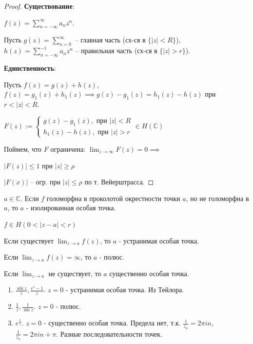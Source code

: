 \begin{proof}
    \textbf{Существование}:

    $f(z) = \sum_{n=-\infty}^{\infty} a_n z^n$.

    Пусть $g(z) = \sum_{n = 0}^{\infty}$ -- главная часть (сх-ся в $\{ |z| < R \}$), $h(z) = \sum_{n = -\infty}^{-1} a_n z^n$ -- правильная часть (сх-ся в $\{ |z| > r \}$).

    \textbf{Единственность}:

    Пусть $f(z) = g(z) + h(z)$, $f(z) = g_1(z) + h_1(z) \implies g(z) - g_1(z) = h_1(z) - h(z)$ при $r < |z| < R$.

    $F(z) := \begin{cases}
        g(z) - g_1(z), \text{ при } |z| < R \\
        h_1(z) - h(z), \text{ при } |z| > r
    \end{cases} \in H(\mathbb{C})$

    Поймем, что $F$ ограничена: $\lim_{z\rightarrow \infty} {F(z)} = 0 \implies$

    $|F(z)| \leq 1$ при $|z| \geq \rho$

    $|F(x)|$ -- огр. при $|z| \leq \rho$ по т. Вейерштрасса.
\end{proof}

\begin{definition}
    $a \in \mathbb{C}$. Если $f$ голоморфна в проколотой окрестности
    точки $a$, но не голоморфна в $a$, то $a$ - изолированная особая точка.
    
    $f \in H(0 < |z - a| < r)$
\end{definition}

\begin{definition}
    Если существует $\lim_{z \to a} f(z)$, то $a$ - устранимая особая точка.

    Если $\lim_{z \to a} f(z) = \infty$, то $a$ - полюс.

    Если $\lim_{z \to a}$ не существует, то $a$ существенно особая точка.
\end{definition}

\begin{example}
    \begin{enumerate}
        \item $\frac{\sin z}{z}, \frac{e^z - 1}{z}$. $z = 0$ - устранимая особая точка. Из Тейлора.
        \item $\frac{1}{z}, \frac{1}{\sin z}$. $z = 0$ - полюс.
        \item $e^{\frac{1}{z}}$. $z = 0$ - существенно особая точка. Предела нет, т.к. $\frac{1}{z_n} = 2\pi i n$, $\frac{1}{z_n} = 2\pi i n + \pi$. Разные последовательности точек.
    \end{enumerate}
\end{example}

